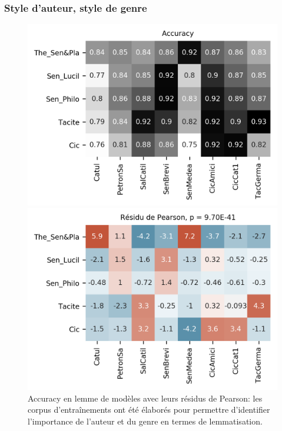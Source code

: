 \subsubsection{Style d'auteur, style de genre}

\begin{figure}[ht]
    \hspace*{-0.05\linewidth}
    \begin{minipage}[c]{0.55\linewidth}
        \includegraphics[width=1\linewidth]{figures/chap3/longreeVariante/LongreeVariante-AccuracyStyleDAuteurStyleDeGenre-Lemme.png}
    \end{minipage} \hfill
    \begin{minipage}[c]{0.55\linewidth}
        \includegraphics[width=1\linewidth]{figures/chap3/longreeVariante/LongreeVariante-AssocPlotStyleDAuteurStyleDeGenre-Lemme.png}
    \end{minipage}
    \caption{Accuracy en lemme de modèles avec leurs résidus de Pearson: les corpus d'entraînements ont été élaborés pour permettre d'identifier l'importance de l'auteur et du genre en termes de lemmatisation.}
    \label{fig:lemmatisation:longree:auteurVSforme}
\end{figure}

